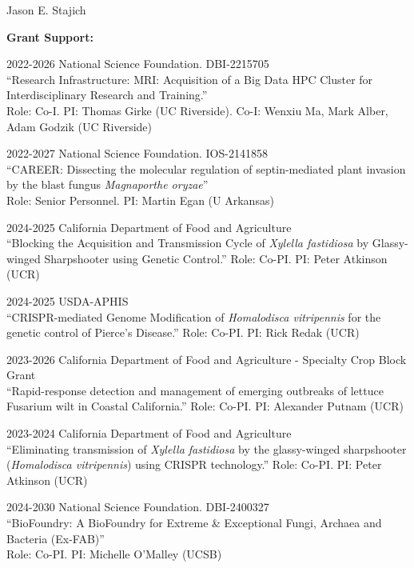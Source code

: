 \documentclass[10pt]{article}
\begin{document}
\begin{cv}{\centerline{Jason E. Stajich}}
\begin{cvlistcompact}{\bf Grant Support:}
\item [2022-2026] National Science Foundation. DBI-2215705 \\
``Research Infrastructure: MRI: Acquisition of a Big Data HPC Cluster for Interdisciplinary Research and Training.'' \\
Role: Co-I. PI: Thomas Girke (UC Riverside). Co-I: Wenxiu Ma, Mark Alber, Adam Godzik (UC Riverside)

\item [2022-2027] National Science Foundation. IOS-2141858 \\
``CAREER: Dissecting the molecular regulation of septin-mediated plant invasion by the blast fungus \textit{Magnaporthe oryzae}'' \\
Role: Senior Personnel. PI: Martin Egan (U Arkansas)

\item [2024-2025] California Department of Food and Agriculture \\
``Blocking the Acquisition and Transmission Cycle of \textit{Xylella fastidiosa} by Glassy-winged Sharpshooter using Genetic Control.''
Role: Co-PI. PI: Peter Atkinson (UCR)

\item [2024-2025] USDA-APHIS \\
``CRISPR-mediated Genome Modification of \textit{Homalodisca vitripennis} for the genetic control of Pierce’s Disease.''
Role: Co-PI. PI: Rick Redak (UCR)

\item [2023-2026] California Department of Food and Agriculture - Specialty Crop Block Grant \\
``Rapid-response detection and management of emerging outbreaks of lettuce Fusarium wilt in Coastal California.''
Role: Co-PI. PI: Alexander Putnam (UCR)

\item [2023-2024] California Department of Food and Agriculture \\
``Eliminating transmission of \textit{Xylella fastidiosa} by the glassy-winged sharpshooter (\textit{Homalodisca vitripennis}) using CRISPR technology.''
Role: Co-PI. PI: Peter Atkinson (UCR)

\item [2024-2030] National Science Foundation. DBI-2400327 \\
``BioFoundry: A BioFoundry for Extreme \& Exceptional Fungi, Archaea and Bacteria (Ex-FAB)'' \\
Role: Co-PI. PI: Michelle O'Malley (UCSB)


\end{cvlistcompact}
\end{cv}
\end{document}
